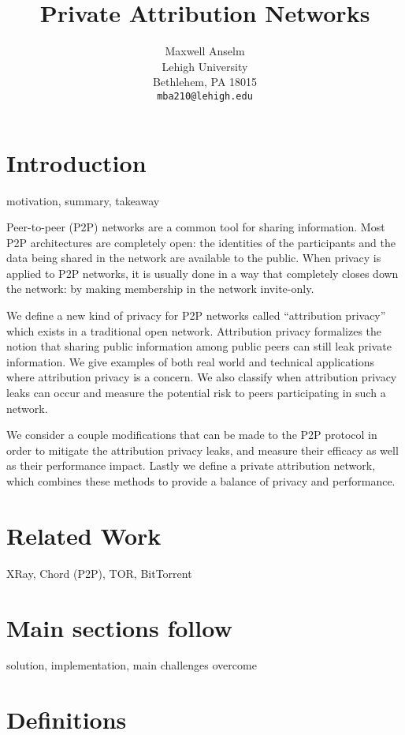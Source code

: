 \documentclass{article}
\title{Private Attribution Networks}
\author{
Maxwell Anselm\\
Lehigh University\\
Bethlehem, PA 18015\\
\texttt{mba210@lehigh.edu}\\
}
\begin{document}
\maketitle

\section{Introduction}

motivation, summary, takeaway

Peer-to-peer (P2P) networks are a common tool for sharing information. Most P2P
architectures are completely open: the identities of the participants and the
data being shared in the network are available to the public. When privacy is
applied to P2P networks, it is usually done in a way that completely closes down
the network: by making membership in the network invite-only\cite{privatep2p}.

We define a new kind of privacy for P2P networks called ``attribution privacy''
which exists in a traditional open network. Attribution privacy formalizes
the notion that sharing public information among public peers can still leak
private information. We give examples of both real world and technical
applications where attribution privacy is a concern. We also classify when
attribution privacy leaks can occur and measure the potential risk to peers
participating in such a network.

We consider a couple modifications that can be made to the P2P protocol in order
to mitigate the attribution privacy leaks, and measure their efficacy as well as
their performance impact. Lastly we define a private attribution network, which
combines these methods to provide a balance of privacy and performance.

\section{Related Work}

XRay, Chord (P2P), TOR, BitTorrent

\section*{Main sections follow}

solution, implementation, main challenges overcome

\section{Definitions}
\end{document}
